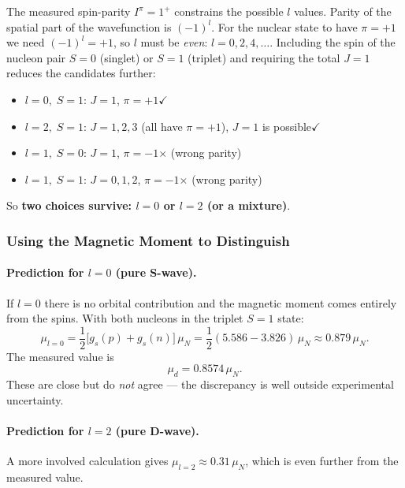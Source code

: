 The measured spin-parity $I^\pi=1^+$ constrains the possible $l$ values.
Parity of the spatial part of the wavefunction is $(-1)^l$.  For the nuclear
state to have $\pi=+1$ we need $(-1)^l=+1$, so $l$ must be \emph{even}: $l=0,
2, 4, \ldots$.  Including the spin of the nucleon pair $S=0$ (singlet) or $S=1$
(triplet) and requiring the total $J=1$ reduces the candidates further:
\begin{itemize}
  \item $l=0,\;S=1$: $J=1$, $\pi=+1$\quad$\checkmark$
  \item $l=2,\;S=1$: $J=1,2,3$ (all have $\pi=+1$), $J=1$ is possible\quad$\checkmark$
  \item $l=1,\;S=0$: $J=1$, $\pi=-1$\quad$\times$ (wrong parity)
  \item $l=1,\;S=1$: $J=0,1,2$, $\pi=-1$\quad$\times$ (wrong parity)
\end{itemize}
So \textbf{two choices survive: $l=0$ or $l=2$ (or a mixture)}.

\subsubsection*{Using the Magnetic Moment to Distinguish}

\paragraph{Prediction for $l=0$ (pure S-wave).}
If $l=0$ there is no orbital contribution and the magnetic moment comes entirely
from the spins.  With both nucleons in the triplet $S=1$ state:
\begin{equation}
  \label{eq:lec04:mu_Swave}
  \mu_{l=0} = \frac{1}{2}\bigl[g_s(p)+g_s(n)\bigr]\,\mu_N
  = \frac{1}{2}(5.586-3.826)\,\mu_N
  \approx 0.879\,\mu_N.
\end{equation}
The measured value is
\begin{equation}
  \label{eq:lec04:mu_measured}
  \mu_d = 0.8574\,\mu_N.
\end{equation}
These are close but do \emph{not} agree — the discrepancy is well outside
experimental uncertainty.

\paragraph{Prediction for $l=2$ (pure D-wave).}
A more involved calculation gives $\mu_{l=2}\approx0.31\,\mu_N$, which is even
further from the measured value.

